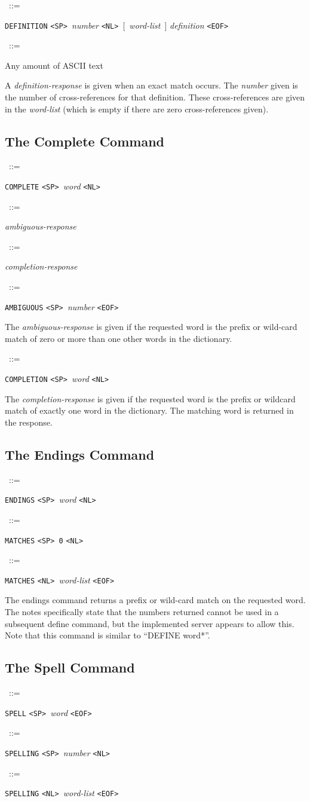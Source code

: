 \documentclass{article}
\newcommand{\SP}{\mbox{\tt <SP>\ }}
\newcommand{\NL}{\mbox{\tt <NL>\ }}
\newcommand{\EOF}{\mbox{\tt <EOF>\ }}
\newcommand{\note}{\bigskip\par\noindent}
\newcommand{\prd}[3][]{\noindent\begin{leftline}\hspace{1em}{\it #2}\ ::=\ %
  \begin{minipage}[t]{.64\textwidth}\raggedright #3\end{minipage}%
    \ifthenelse{\equal{#1}{}}{}%
    {\begin{minipage}[t]{.54\textwidth}\raggedright #1\end{minipage}%
      \vspace{1ex}}%
    \end{leftline}}
\newcommand{\opt}[1]{[~#1~]}
\newcommand{\lhs}[1]{{\it #1\/}}
\newcommand{\lit}[1]{{\tt #1}}
\begin{document}
\prd{definition-response}{\lit{DEFINITION} \SP \lhs{number}
  \NL \opt{\lhs{word-list}} \lhs{definition} \EOF}
\prd{definition}{Any amount of ASCII text}

\note A \lhs{definition-response} is given when an exact match occurs.  The
\lhs{number} given is the number of cross-references for that definition.
These cross-references are given in the \lhs{word-list} (which is empty if
there are zero cross-references given).


\subsection{The Complete Command}

\prd{complete}{\lit{COMPLETE} \SP \lhs{word} \NL}
\prd{complete-response}{\lhs{ambiguous-response}}
\prd{complete-response}{\lhs{completion-response}}

\prd{ambiguous-response}{\lit{AMBIGUOUS} \SP \lhs{number} \EOF}

\note The \lhs{ambiguous-response} is given if the requested word is the
prefix or wild-card match of zero or more than one other words in the
dictionary.\note

\prd{completion-response}{\lit{COMPLETION} \SP \lhs{word} \NL}

\note The \lhs{completion-response} is given if the requested word is the
prefix or wildcard match of exactly one word in the dictionary.  The
matching word is returned in the response.


\subsection{The Endings Command}

\prd{endings}{\lit{ENDINGS} \SP \lhs{word} \NL}
\prd{endings-response}{\lit{MATCHES} \SP \lit{0} \NL}
\prd{endings-response}{\lit{MATCHES} \NL \lhs{word-list} \EOF}

\note The endings command returns a prefix or wild-card match on the
requested word.  The notes specifically state that the numbers returned
cannot be used in a subsequent define command, but the implemented server
appears to allow this.  Note that this command is similar to ``DEFINE
word*''.


\subsection{The Spell Command}

\prd{spell}{\lit{SPELL} \SP \lhs{word} \EOF}
\prd{spell-response}{\lit{SPELLING} \SP \lhs{number} \NL}
\prd{spell-response}{\lit{SPELLING} \NL \lhs{word-list} \EOF}
\end{document}
